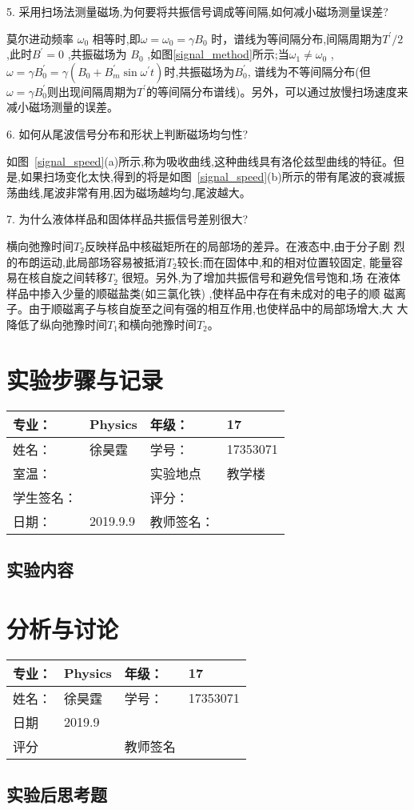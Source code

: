 \documentclass{ctexart}
\begin{document}
5. 采用扫场法测量磁场,为何要将共振信号调成等间隔,如何减小磁场测量误差?

莫尔进动频率 $\omega_0$ 相等时,即$\omega = \omega_0 =\gamma B_0$ 时，谱线为等间隔分布,间隔周期为$T^{\prime}/2$ ,此时$B^{\prime}= 0$ ,共振磁场为 $B_0$ ,如图\ref{signal_method}所示;当$\omega_1 \ne \omega_0$ , $\omega = \gamma B_0^{\prime} = \gamma(B_0 + B_m^{\prime}\sin\omega^{\prime} t)$时,共振磁场为$B_0^{\prime}$, 谱线为不等间隔分布(但$\omega = \gamma B_0^{\prime}$则出现间隔周期为$T^{\prime}$的等间隔分布谱线)。另外，可以通过放慢扫场速度来减小磁场测量的误差。

6. 如何从尾波信号分布和形状上判断磁场均匀性?

如图~\ref{signal_speed}(a)所示,称为吸收曲线,这种曲线具有洛伦兹型曲线的特征。但是,如果扫场变化太快,得到的将是如图~\ref{signal_speed}(b)所示的带有尾波的衰减振荡曲线,尾波非常有用,因为磁场越均匀,尾波越大。

7. 为什么液体样品和固体样品共振信号差别很大?

横向弛豫时间$T_2$反映样品中核磁矩所在的局部场的差异。在液态中,由于分子剧
烈的布朗运动,此局部场容易被抵消$T_2$较长;而在固体中,和的相对位置较固定,
能量容易在核自旋之间转移$T_2$ 很短。另外,为了增加共振信号和避免信号饱和,场
在液体样品中掺入少量的顺磁盐类(如三氯化铁)
,使样品中存在有未成对的电子的顺
磁离子。由于顺磁离子与核自旋至之间有强的相互作用,也使样品中的局部场增大,大
大降低了纵向弛豫时间$T_1$和横向弛豫时间$T_2$。
\newpage
\section{实验步骤与记录}
\begin{tabular}{|p{8em}|p{8em}|p{8em}|p{8em}|}
	\hline 
	专业：     &Physics       &年级：      & 17     \\
	\hline
	姓名：& 徐昊霆 &学号：&17353071  \\
	\hline
	室温：&                    &实验地点 & 教学楼 \\
	\hline	
	学生签名： & & 评分： & \\
	\hline
	日期： & 2019.9.9 & 教师签名：&  \\
	\hline
\end{tabular}
\subsection{实验内容}

\newpage
\section{分析与讨论}
\begin{tabular}{|p{8em}|p{8em}|p{8em}|p{8em}|}
	\hline 
	专业：     &Physics       &年级：      & 17     \\
	\hline
	姓名：& 徐昊霆 &学号：&17353071  \\
	\hline
	日期&     2019.9               & &  \\
	\hline	
	评分 & & 教师签名 & \\
	\hline
\end{tabular}





\subsection{实验后思考题}




\end{document}
